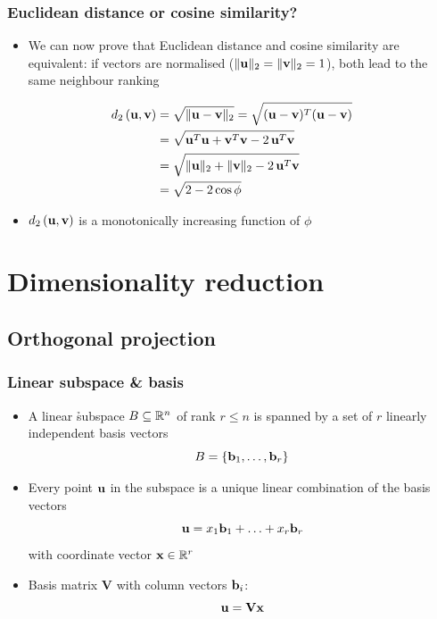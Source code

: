 \documentclass[t]{beamer} %
\begin{document}
\begin{frame}[fragile]
  \frametitle{Euclidean distance or cosine similarity?}

  \begin{itemize}
  \item We can now prove that Euclidean distance and cosine similarity are equivalent: 
    if vectors are normalised ($\norm[2]{\vu} = \norm[2]{\vv} = 1$), both lead to the same neighbour ranking
  \end{itemize}

  \begin{align*}
    \dist[2]{\vu}{\vv} 
    &= \sqrt{\norm[2]{\vu - \vv}}
    = \sqrt{(\vu - \vv)^T (\vu - \vv)}
    \\
    &= \sqrt{\vu^T \vu + \vv^T \vv - 2\, \vu^T \vv}
    \\
    &= \sqrt{\norm[2]{\vu} + \norm[2]{\vv} - 2\, \vu^T \vv}
    \\
    &= \sqrt{2 - 2 \cos \phi}
  \end{align*}
  \ungap
  \begin{itemize}
  \item[\hand] $\dist[2]{\vu}{\vv}$ is a monotonically increasing function of $\phi$
  \end{itemize}
\end{frame}


\section{Dimensionality reduction}

\subsection{Orthogonal projection}

\begin{frame}
  \frametitle{Linear subspace \& basis}
  
  \begin{itemize}
  \item A linear \h{subspace} $B\subseteq \mathbb{R}^n$ of rank $r\leq n$ is spanned by a set of $r$ linearly independent basis vectors
    \[
    B = \set{\vb_1, \ldots, \vb_r}
    \]
  \item<2-> Every point $\vu$ in the subspace is a unique linear combination of the basis vectors
    \[
    \vu = x_1 \vb_1 + \ldots + x_r \vb_r
    \]
    with coordinate vector $\vx\in \setR^r$
  \item<3-> Basis matrix $\mathbf{V}$ with column vectors $\vb_i$:
    \[
    \vu = \mathbf{V} \vx
    \]
  \end{itemize}
\end{frame}
\end{document}
